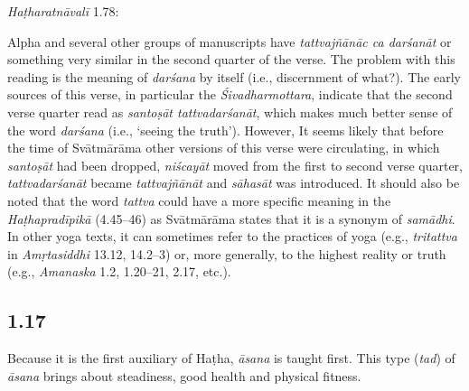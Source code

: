 \begin{ekdosis}
\begin{testimonia}[hp01_016]
\begin{versinnote}
\end{versinnote}

\emph{Haṭharatnāvalī} 1.78:

\begin{versinnote}
\tl{\var{niścayād ] niścalād- P,T}\\!}
\end{versinnote}

\end{testimonia}

\begin{philcomm}[hp01_016]    
Alpha and several other groups of manuscripts have \emph{tattvajñānāc ca darśanāt} or something very similar in the second quarter of the verse. The problem with this reading is the meaning of \emph{darśana} by itself (i.e., discernment of what?). The early sources of this verse, in particular the \emph{Śivadharmottara}, indicate that the second verse quarter read as \emph{santoṣāt tattvadarśanāt}, which makes much better sense of the word \emph{darśana} (i.e., ‘seeing the truth’). However, It seems likely that before the time of Svātmārāma other versions of this verse were circulating, in which \emph{santoṣāt} had been dropped, \emph{niścayāt} moved from the first to second verse quarter, \emph{tattvadarśanāt} became \emph{tattvajñānāt} and \emph{sāhasāt} was introduced. It should also be noted that the word \emph{tattva} could have a more specific meaning in the \emph{Haṭhapradīpikā} (4.45–46) as Svātmārāma states that it is a synonym of \emph{samādhi}. In other yoga texts, it can sometimes refer to the practices of yoga (e.g., \emph{tritattva} in \emph{Amṛtasiddhi} 13.12, 14.2--3) or, more generally, to the highest reality or truth (e.g., \emph{Amanaska} 1.2, 1.20–21, 2.17, etc.).  
\end{philcomm}

\subsection*{1.17}
\begin{translation}[hp01_017]
Because it is the first auxiliary of Haṭha, \emph{āsana} is taught first. This type (\emph{tad}) of \emph{āsana} brings about steadiness, good health and physical fitness.
\end{translation}


\end{ekdosis}
